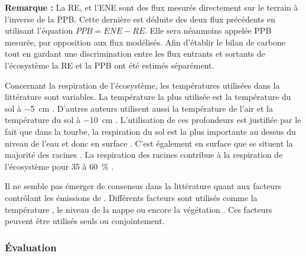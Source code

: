 \begin{center}
\begin{minipage}{.85\textwidth}
\setlength{\parindent}{-10pt}%
\onehalfspacing
\textbf{Remarque :} La RE, et l'ENE sont des flux mesurés directement sur le terrain à l'inverse de la PPB.
Cette dernière est déduite des deux flux précédents en utilisant l'équation $PPB = ENE - RE$.
Elle sera néanmoins appelée PPB mesurée, par opposition aux flux modélisés.
Afin d'établir le bilan de carbone tout en gardant une discrimination entre les flux entrants et sortants de l'écosystème la RE et la PPB ont été estimés séparément.
\end{minipage}
\end{center}

Concernant la respiration de l'écosystème, les températures utilisées dans la littérature sont variables.
La température la plus utilisée est la température du sol à \SI{-5}{\centi\metre}  \citep{ballantyne2014}.
D'autres auteurs utilisent aussi la température de l'air et la température du sol à \SI{-10}{\centi\metre} \citep{bortoluzzi2006a,kim1992}.
L'utilisation de ces profondeurs est justifiée par le fait que dans la tourbe, la respiration du sol est la plus importante au dessus du niveau de l'eau et donc en surface \citep{Luo200661}. %
C'est également en surface que se situent la majorité des racines \citep{rydin2013c}.
La respiration des racines contribue à la respiration de l'écosystème pour 35 à \SI{60}{\percent} \citep{silvola1996,crow2005}.

Il ne semble pas émerger de consensus dans la littérature quant aux facteurs contrôlant les émissions de \chh.
Différents facteurs sont utilisés comme la température \citep{alm1999,bubier1995b}, le niveau de la nappe \citep{bubier1993a} ou encore la végétation \citep{bortoluzzi2006a}.
Ces facteurs peuvent être utilisés seuls ou conjointement.

\subsubsection{Évaluation}

